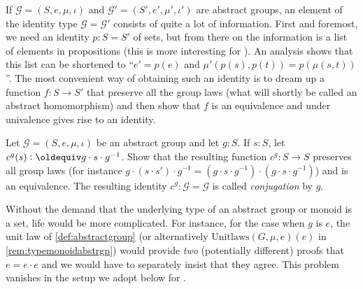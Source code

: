 \begin{remark}
  If $\mathcal G=(S,e,\mu,\iota)$ and $\mathcal G'=(S',e',\mu',\iota')$ are abstract groups, an element of the identity type $\mathcal G=\mathcal G'$ consists of quite a lot of information.  First and foremost, we need an identity $p:S=S'$ of sets, but from there on the information is a list of elements in propositions (this is more interesting for \inftygps).  An analysis shows that this list can be shortened to ``$e'=p(e)$ and $\mu'(p(s),p(t))=p(\mu(s,t))$''.  The most convenient way of obtaining such an identity is to dream up a function $f:S\to S'$ that preserve all the group laws (\ie what will shortly be called an abstract homomorphism) and then show that $f$ is an equivalence and  under univalence gives rise to an identity.
\end{remark}
\begin{xca}
  \label{xca:conj}
  Let $\mathcal G=(S,e,\mu,\iota)$ be an abstract group and let $g:S$.  If $s:S$, let $c^g(s)\defequi g\cdot s\cdot g^{-1}$.  Show that the resulting function $c^g:S\to S$ preserves all group laws (for instance $g\cdot(s\cdot s')\cdot g^{-1}=(g\cdot s\cdot g^{-1} )\cdot(g\cdot s\cdot g^{-1})$) and is an equivalence.  The resulting identity $c^g:\mathcal G=\mathcal G$ is called \emph{conjugation} by $g$.
\end{xca}

  \begin{remark}
Without the demand that the underlying type of an abstract group or monoid is a set, life would be more complicated.  For instance, for the case when $g$ is $e$, the unit law of \cref{def:abstractgroup} (or alternatively $\mathrm{Unitlaws}(G,\mu{},e)(e)$ in \cref{rem:typemonoidabstrgp}) would provide \emph{two} (potentially different) proofs that $e=e\cdot e$ and we would have to separately insist that they agree.  This problem vanishes in the setup we adopt below for \inftygps.
  \end{remark}

